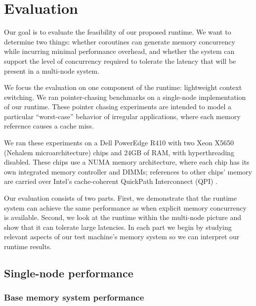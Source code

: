 \documentclass[10pt,nocopyrightspace]{sigplanconf}
\begin{document}

\section{Evaluation}
\label{sec:evaluation}

Our goal is to evaluate the feasibility of our proposed runtime. We
want to determine two things: whether coroutines can generate memory
concurrency while incurring minimal performance overhead, and whether the system can support the level of concurrency required to tolerate the latency that will be present in a multi-node system.

We focus the evaluation on one component of the runtime: lightweight context switching. We ran pointer-chasing benchmarks on a single-node implementation of our runtime. These pointer chasing experiments are intended to model a particular ``worst-case'' behavior of irregular applications, where each memory reference causes a cache miss.

We ran these experiments on a Dell PowerEdge R410 with two Xeon X5650 (Nehalem microarchitecture)
chips and 24GB of RAM, with hyperthreading disabled. These
chips use a NUMA memory architecture, where each chip has
its own integrated memory controller and DIMMs; references to other
chips' memory are carried over Intel's cache-coherent QuickPath
Interconnect (QPI) \cite{quickpath:website}.

Our evaluation consists of two parts. First, we demonstrate that the
runtime system can achieve the same performance as when 
explicit memory concurrency is available. Second, we look at the runtime
within the multi-node picture and show that it can tolerate large
latencies. In each part we begin by studying relevant aspects of our
test machine's memory system so we can interpret our runtime results.


\subsection{Single-node performance}


\subsubsection{Base memory system performance}
\label{subsubsec:evalsinglebase}
\end{document}
